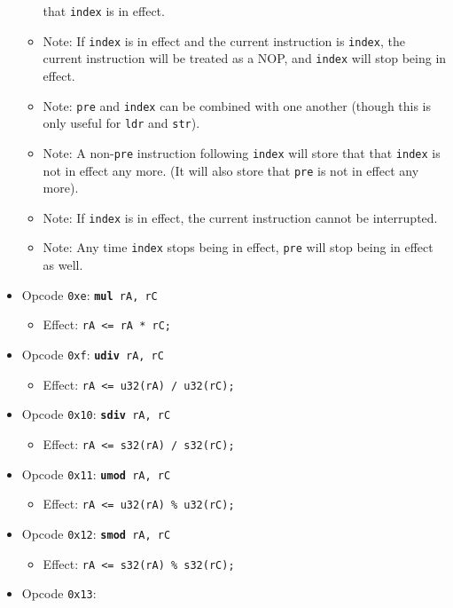 \documentclass{article}
\begin{document}
\begin{itemize}
\begin{itemize}
			that \texttt{index} is in effect.
			\item Note:  If \texttt{index} is in effect and the current
			instruction is \texttt{index}, the current instruction will be
			treated as a NOP, and \texttt{index} will stop being in effect.
			\item Note:  \texttt{pre} and \texttt{index} can be combined
			with one another (though this is only useful for \texttt{ldr}
			and \texttt{str}).
			\item Note:  A non-\texttt{pre} instruction following
			\texttt{index} will store that that \texttt{index} is not in
			effect any more.  (It will also store that \texttt{pre} is not
			in effect any more).
			\item Note:  If \texttt{index} is in effect, the current
			instruction cannot be interrupted.
			\item Note:  Any time \texttt{index} stops being in effect,
			\texttt{pre} will stop being in effect as well.
		\end{itemize}
		\item Opcode \texttt{0xe}:
			\texttt{\textbf{mul} rA, rC}
		\begin{itemize}
			\item Effect:  \texttt{rA <= rA * rC;}
		\end{itemize}
		\item Opcode \texttt{0xf}:
			\texttt{\textbf{udiv} rA, rC}
		\begin{itemize}
			\item Effect:  \texttt{rA <= u32(rA) / u32(rC);}
		\end{itemize}
		\item Opcode \texttt{0x10}:
			\texttt{\textbf{sdiv} rA, rC}
		\begin{itemize}
			\item Effect:  \texttt{rA <= s32(rA) / s32(rC);}
		\end{itemize}
		\item Opcode \texttt{0x11}:
			\texttt{\textbf{umod} rA, rC}
		\begin{itemize}
			\item Effect:  \texttt{rA <= u32(rA) \% u32(rC);}
		\end{itemize}
		\item Opcode \texttt{0x12}:
			\texttt{\textbf{smod} rA, rC}
		\begin{itemize}
			\item Effect:  \texttt{rA <= s32(rA) \% s32(rC);}
		\end{itemize}
		\item Opcode \texttt{0x13}:

\end{itemize}
\end{document}
